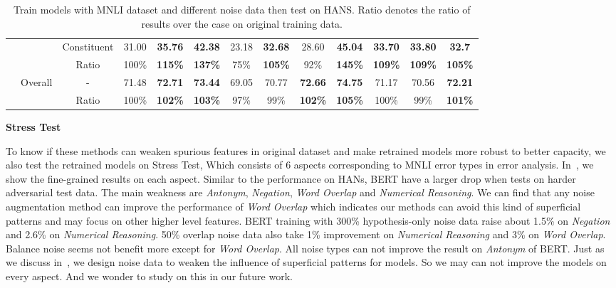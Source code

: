 \begin{table}[]
\begin{tabular}{|c|c|c|c|c|c|c|c|c|c|c|c|c|}
                          &                               & Constituent     & 31.00                     & \bf 35.76                          & \bf 42.38   & 23.18   & \bf 32.68   & 28.60   & \bf 45.04   & \bf 33.70  & \bf 33.80  & \bf 32.7   \\ \cline{3-13} 
                          &                               & Ratio           & 100\%                     & \bf 115\%                          & \bf 137\%   & 75\%    & \bf 105\%   & 92\%    & \bf 145\%   & \bf 109\%  & \bf 109\%  & \bf 105\%  \\ \cline{2-13} 
                          & \multirow{2}{*}{Overall}      & -               & 71.48                     & \bf 72.71                          & \bf 73.44   & 69.05   & 70.77   & \bf 72.66   & \bf 74.75   & 71.17  & 70.56  & \bf 72.21  \\ \cline{3-13} 
                          &                               & Ratio           & 100\%                     & \bf 102\%                          & \bf 103\%   & 97\%    & 99\%    & \bf 102\%   & \bf 105\%   & 100\%  & 99\%   & \bf 101\%  \\ \hline
\end{tabular}
\caption{Train models with MNLI dataset and different noise data then test on HANS. 
Ratio denotes the ratio of results over the case on original training data.}
	\label{tab:HANS}
\end{table}


\noindent\textbf{Stress Test} 

To know
if these methods can weaken spurious features in original dataset 
and make retrained models
more robust to better capacity, we also test the retrained models on Stress Test, 
Which consists of 6 aspects corresponding to MNLI error 
types in error analysis. In~, we show the fine-grained results 
on each aspect. Similar to the performance on HANs, BERT have a larger drop when 
tests on harder adversarial test data. The main weakness are \textit{Antonym}, 
\textit{Negation}, \textit{ Word Overlap} and \textit{Numerical Reasoning}. 
We can find that any noise augmentation method can improve the performance of 
\textit{ Word Overlap} which indicates our methods can avoid this kind of superficial
patterns and may focus on other higher level features. BERT training with 
300\% hypothesis-only noise data raise about 1.5\% on \textit{Negation} and 2.6\% 
on \textit{Numerical Reasoning}. 50\% overlap noise data also take 1\% improvement 
on  \textit{Numerical Reasoning} and 3\% on \textit{ Word Overlap}. Balance noise 
seems not benefit more except for \textit{ Word Overlap}. All noise types can not 
improve the result on \textit{Antonym} of BERT.
Just as we discuss in~, we design noise data 
to weaken the influence of superficial patterns for models. So we may can not 
improve the models on every aspect. And we wonder to study on this in our future work.

